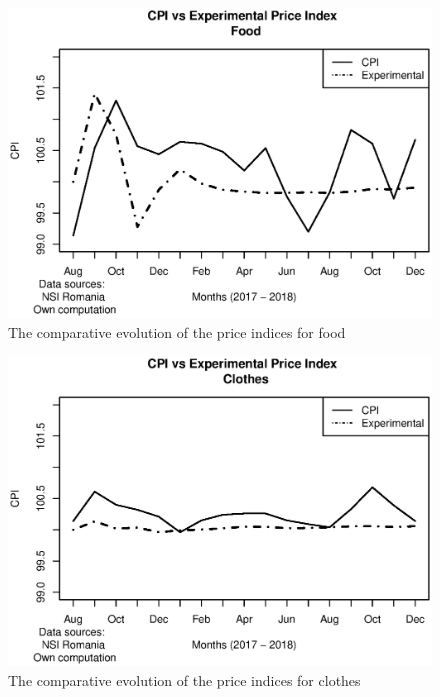 \documentclass[]{article}
\begin{document}
\clearpage

\begin{figure}
	\centering
	\includegraphics[width=1\linewidth]{fig3.eps}
	\caption{The comparative evolution of the price indices for food}
	\label{fig:4}
\end{figure}

\clearpage

\begin{figure}
	\centering
	\includegraphics[width=1\linewidth]{fig4.eps}
	\caption{The comparative evolution of the price indices for clothes}
	\label{fig:5}
\end{figure}

\clearpage
\end{document}
